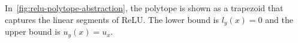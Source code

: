 \documentclass[oneside,11pt,dvipsnames]{book}
\numberwithin{equation}{section}
\theoremstyle{definition}
\theoremstyle{remark}
\newcommand{\tvn}[1]{\iftoggle{usecomment}{{\color{red}{[TVN]: #1}}}{}}
\newcommand{\hd}[1]{\iftoggle{usecomment}{{\color{blue}{[HD]: #1}}}{}}
\begin{document}
\begin{itemize}
    In~\autoref{fig:relu-polytope-abstraction}, the polytope is shown as a \colorbox{yellowfill}{trapezoid} that captures the linear segments of ReLU. The lower bound is $l_y(x) = 0$ and the upper bound is $u_y(x) = u_x$. %

\end{itemize}

    
\end{document}
